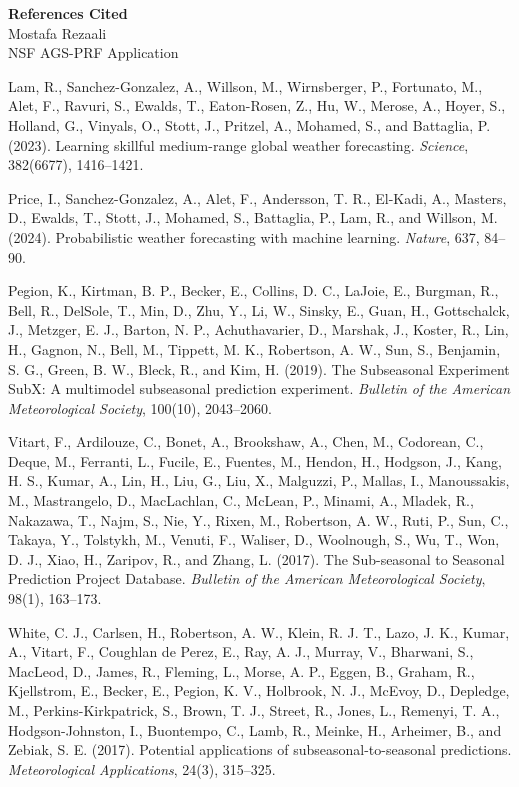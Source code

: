 \documentclass[11pt,letterpaper]{article}
\begin{document}
\begin{center}
{\Large\bfseries References Cited}\\[0.05in]
{\normalsize Mostafa Rezaali}\\
{\normalsize NSF AGS-PRF Application}
\end{center}
\vspace{-0.08in}
\noindent Lam, R., Sanchez-Gonzalez, A., Willson, M., Wirnsberger, P., Fortunato, M., Alet, F., Ravuri, S., Ewalds, T., Eaton-Rosen, Z., Hu, W., Merose, A., Hoyer, S., Holland, G., Vinyals, O., Stott, J., Pritzel, A., Mohamed, S., and Battaglia, P. (2023). Learning skillful medium-range global weather forecasting. \textit{Science}, 382(6677), 1416--1421.

\noindent Price, I., Sanchez-Gonzalez, A., Alet, F., Andersson, T. R., El-Kadi, A., Masters, D., Ewalds, T., Stott, J., Mohamed, S., Battaglia, P., Lam, R., and Willson, M. (2024). Probabilistic weather forecasting with machine learning. \textit{Nature}, 637, 84--90.

\noindent Pegion, K., Kirtman, B. P., Becker, E., Collins, D. C., LaJoie, E., Burgman, R., Bell, R., DelSole, T., Min, D., Zhu, Y., Li, W., Sinsky, E., Guan, H., Gottschalck, J., Metzger, E. J., Barton, N. P., Achuthavarier, D., Marshak, J., Koster, R., Lin, H., Gagnon, N., Bell, M., Tippett, M. K., Robertson, A. W., Sun, S., Benjamin, S. G., Green, B. W., Bleck, R., and Kim, H. (2019). The Subseasonal Experiment SubX: A multimodel subseasonal prediction experiment. \textit{Bulletin of the American Meteorological Society}, 100(10), 2043--2060.

\noindent Vitart, F., Ardilouze, C., Bonet, A., Brookshaw, A., Chen, M., Codorean, C., Deque, M., Ferranti, L., Fucile, E., Fuentes, M., Hendon, H., Hodgson, J., Kang, H. S., Kumar, A., Lin, H., Liu, G., Liu, X., Malguzzi, P., Mallas, I., Manoussakis, M., Mastrangelo, D., MacLachlan, C., McLean, P., Minami, A., Mladek, R., Nakazawa, T., Najm, S., Nie, Y., Rixen, M., Robertson, A. W., Ruti, P., Sun, C., Takaya, Y., Tolstykh, M., Venuti, F., Waliser, D., Woolnough, S., Wu, T., Won, D. J., Xiao, H., Zaripov, R., and Zhang, L. (2017). The Sub-seasonal to Seasonal Prediction Project Database. \textit{Bulletin of the American Meteorological Society}, 98(1), 163--173.

\noindent White, C. J., Carlsen, H., Robertson, A. W., Klein, R. J. T., Lazo, J. K., Kumar, A., Vitart, F., Coughlan de Perez, E., Ray, A. J., Murray, V., Bharwani, S., MacLeod, D., James, R., Fleming, L., Morse, A. P., Eggen, B., Graham, R., Kjellstrom, E., Becker, E., Pegion, K. V., Holbrook, N. J., McEvoy, D., Depledge, M., Perkins-Kirkpatrick, S., Brown, T. J., Street, R., Jones, L., Remenyi, T. A., Hodgson-Johnston, I., Buontempo, C., Lamb, R., Meinke, H., Arheimer, B., and Zebiak, S. E. (2017). Potential applications of subseasonal-to-seasonal predictions. \textit{Meteorological Applications}, 24(3), 315--325.
\end{document}
